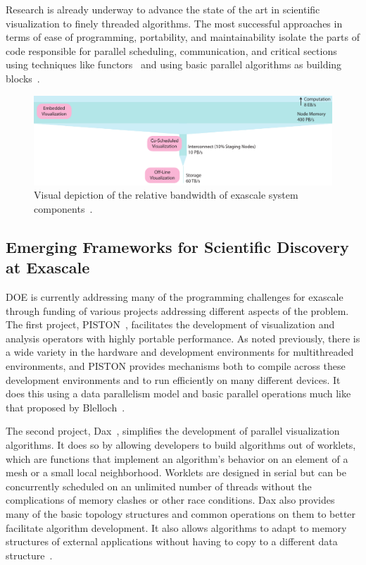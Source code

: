 \documentclass[conference]{IEEEtran}
\newcommand*{\lcite}[1]{~\cite{#1}}
\newcommand*{\scite}[1]{~\cite{#1}}
\begin{document}
Research is already underway to advance the state of the art in scientific
visualization to finely threaded algorithms.  The most successful
approaches in terms of ease of programming, portability, and
maintainability isolate the parts of code responsible for parallel
scheduling, communication, and critical sections using techniques like
functors\lcite{Baker2010} and using basic parallel algorithms as building
blocks\lcite{Blelloch1990}.

\begin{figure}
  \centering
  \includegraphics{images/MinardInSitu}
  \caption{Visual depiction of the relative bandwidth of exascale system
    components\lcite{ScientificDiscoveryExascale2011}.}
  \label{fig:IOBandwidths}
\end{figure}

\subsection{Emerging Frameworks for Scientific Discovery at Exascale}

\noindent
DOE is currently addressing many of the programming challenges for exascale
through funding of various projects addressing different aspects of the
problem.  The first project, PISTON\lcite{PISTON}, facilitates the
development of visualization and analysis operators with highly portable
performance.  As noted previously, there is a wide variety in the hardware
and development environments for multithreaded environments, and PISTON
provides mechanisms both to compile across these development environments
and to run efficiently on many different devices.  It does this using a
data parallelism model and basic parallel operations much like that
proposed by Blelloch\scite{Blelloch1990}.

The second project, Dax\lcite{Moreland2011:LDAV}, simplifies the
development of parallel visualization algorithms.  It does so by allowing
developers to build algorithms out of worklets, which are functions that
implement an algorithm's behavior on an element of a mesh or a small local
neighborhood.  Worklets are designed in serial but can be concurrently
scheduled on an unlimited number of threads without the complications of
memory clashes or other race conditions.  Dax also provides many of the
basic topology structures and common operations on them to better
facilitate algorithm development.  It also allows algorithms to adapt to
memory structures of external applications without having to copy to a
different data structure\lcite{Moreland2012:PDAC}.
\end{document}
